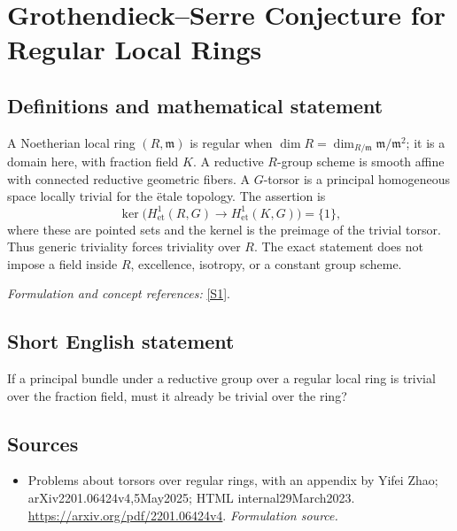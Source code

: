 \documentclass[11pt]{article}
\begin{document}
\section*{\texorpdfstring{Grothendieck–Serre Conjecture for Regular Local Rings}{Grothendieck–Serre Conjecture for Regular Local Rings}}\label{30002360}
\subsection{Definitions and mathematical statement}
A Noetherian local ring $(R,\mathfrak m)$ is regular when
$\dim R=\dim_{R/\mathfrak m}\mathfrak m/\mathfrak m^2$; it is a domain here, with fraction field $K$. A reductive $R$-group scheme is smooth affine with connected reductive geometric fibers. A $G$-torsor is a principal homogeneous space locally trivial for the \"etale topology. The assertion is
\[
 \ker\bigl(H^1_{\mathrm{et}}(R,G)\to H^1_{\mathrm{et}}(K,G)\bigr)=\{1\},
\]
where these are pointed sets and the kernel is the preimage of the trivial torsor. Thus generic triviality forces triviality over $R$. The exact statement does not impose a field inside $R$, excellence, isotropy, or a constant group scheme.
\par\smallskip\textit{Formulation and concept references:} \href{https://arxiv.org/pdf/2201.06424v4}{[S1]}.

\subsection{Short English statement}
If a principal bundle under a reductive group over a regular local ring is trivial over the fraction field, must it already be trivial over the ring?
\subsection{Sources}
\begin{itemize}
\item[S1]Problems about torsors over regular rings, with an appendix by Yifei Zhao; arXiv2201.06424v4,5May2025; HTML internal29March2023.
\url{https://arxiv.org/pdf/2201.06424v4}.
\textit{Formulation source.}
\end{itemize}
\end{document}
